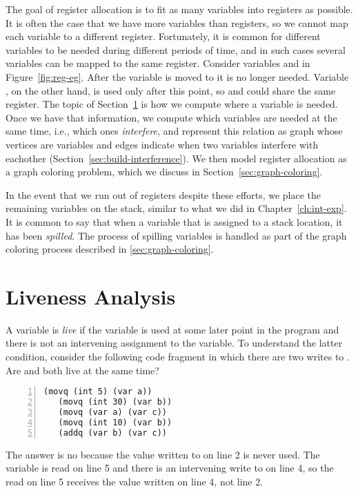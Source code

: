 \documentclass[11pt]{book}
\begin{document}
The goal of register allocation is to fit as many variables into
registers as possible. It is often the case that we have more
variables than registers, so we cannot map each variable to a
different register. Fortunately, it is common for different variables
to be needed during different periods of time, and in such cases
several variables can be mapped to the same register.  Consider
variables  and  in Figure~\ref{fig:reg-eg}.  After the
variable  is moved to  it is no longer needed.
Variable , on the other hand, is used only after this point,
so  and  could share the same register. The topic of
Section~\ref{sec:liveness-analysis} is how we compute where a variable
is needed.  Once we have that information, we compute which variables
are needed at the same time, i.e., which ones \emph{interfere}, and
represent this relation as graph whose vertices are variables and
edges indicate when two variables interfere with eachother
(Section~\ref{sec:build-interference}). We then model register
allocation as a graph coloring problem, which we discuss in
Section~\ref{sec:graph-coloring}.

In the event that we run out of registers despite these efforts, we
place the remaining variables on the stack, similar to what we did in
Chapter~\ref{ch:int-exp}. It is common to say that when a variable
that is assigned to a stack location, it has been \emph{spilled}. The
process of spilling variables is handled as part of the graph coloring
process described in \ref{sec:graph-coloring}.


\section{Liveness Analysis}
\label{sec:liveness-analysis}

A variable is \emph{live} if the variable is used at some later point
in the program and there is not an intervening assignment to the
variable.
%
To understand the latter condition, consider the following code
fragment in which there are two writes to . Are  and
 both live at the same time?
\begin{lstlisting}[numbers=left,numberstyle=\tiny]
   (movq (int 5) (var a))
   (movq (int 30) (var b))
   (movq (var a) (var c))
   (movq (int 10) (var b))
   (addq (var b) (var c))
\end{lstlisting}
The answer is no because the value  written to  on
line 2 is never used. The variable  is read on line 5 and
there is an intervening write to  on line 4, so the read on
line 5 receives the value written on line 4, not line 2.
\end{document}

